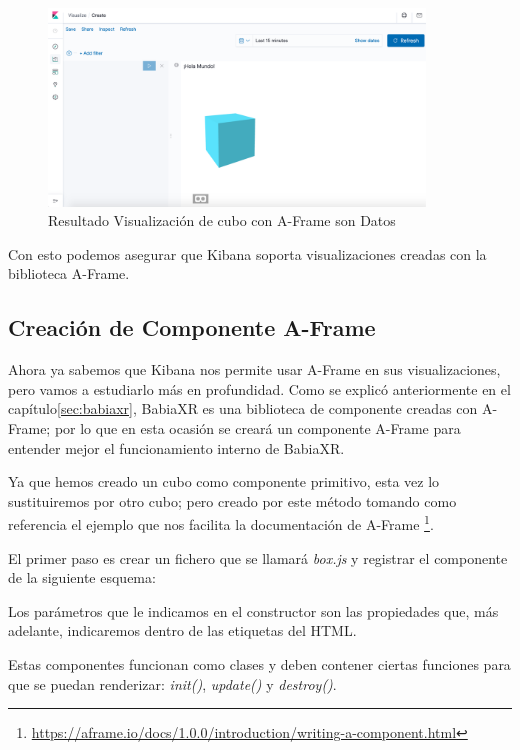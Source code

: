 \documentclass[a4paper, 12pt]{book}
\begin{document}
\begin{figure}[H]
  \centering
  \includegraphics[width=10cm, keepaspectratio]{img/development/resultado-aframe-box.png}
  \caption{Resultado Visualización de cubo con A-Frame son Datos}
  \label{fig:resultadoaframesindatos}
\end{figure}

Con esto podemos asegurar que Kibana soporta visualizaciones creadas con la biblioteca A-Frame.




\subsection{Creación de Componente A-Frame}

Ahora ya sabemos que Kibana nos permite usar A-Frame en sus visualizaciones, pero vamos a estudiarlo más en profundidad. Como se explicó anteriormente en el capítulo\ref{sec:babiaxr}, BabiaXR es una biblioteca de componente creadas con A-Frame; por lo que en esta ocasión se creará un componente A-Frame para entender mejor el funcionamiento interno de BabiaXR.

Ya que hemos creado un cubo como componente primitivo, esta vez lo sustituiremos por otro cubo; pero creado por este método tomando como referencia el ejemplo que nos facilita la documentación de A-Frame \footnote{\url{https://aframe.io/docs/1.0.0/introduction/writing-a-component.html}}. 

El primer paso es crear un fichero que se llamará \textit{box.js} y registrar el componente de la siguiente esquema:



Los parámetros que le indicamos en el constructor son las propiedades que, más adelante, indicaremos dentro de las etiquetas del HTML.

Estas componentes funcionan como clases y deben contener ciertas funciones para que se puedan renderizar: \textit{init()}, \textit{update()} y \textit{destroy()}.
\end{document}
